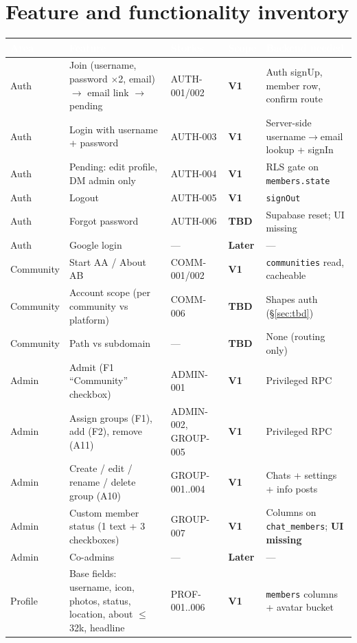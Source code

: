 \documentclass[11pt,a4paper]{article}
\newcommand{\hdr}[1]{\textcolor{white}{\textbf{#1}}}
\newcommand{\vone}{\textcolor{p0}{\textbf{V1}}}
\newcommand{\later}{\textcolor{p1}{\textbf{Later}}}
\newcommand{\tbd}{\textcolor{tbd}{\textbf{TBD}}}
\newcommand{\code}[1]{\texttt{\small #1}}
\begin{document}
\section{Feature and functionality inventory}
{\small
{}
\begin{longtable}{L{1.9cm} L{5.2cm} L{2.2cm} L{1.1cm} L{4.6cm}}
\hdr{Area} & \hdr{Feature} & \hdr{Stories} & \hdr{Scope} & \hdr{Backend needed}\\
\endhead
Auth & Join (username, password $\times$2, email) $\rightarrow$ email link $\rightarrow$ pending & AUTH-001/002 & \vone & Auth signUp, member row, confirm route\\
Auth & Login with username + password & AUTH-003 & \vone & Server-side username$\rightarrow$email lookup + signIn\\
Auth & Pending: edit profile, DM admin only & AUTH-004 & \vone & RLS gate on \code{members.state}\\
Auth & Logout & AUTH-005 & \vone & \code{signOut}\\
Auth & Forgot password & AUTH-006 & \tbd & Supabase reset; UI missing\\
Auth & Google login & --- & \later & ---\\
Community & Start AA / About AB & COMM-001/002 & \vone & \code{communities} read, cacheable\\
Community & Account scope (per community vs platform) & COMM-006 & \tbd & Shapes auth (\S\ref{sec:tbd})\\
Community & Path vs subdomain & --- & \tbd & None (routing only)\\
Admin & Admit (F1 ``Community'' checkbox) & ADMIN-001 & \vone & Privileged RPC\\
Admin & Assign groups (F1), add (F2), remove (A11) & ADMIN-002, GROUP-005 & \vone & Privileged RPC\\
Admin & Create / edit / rename / delete group (A10) & GROUP-001..004 & \vone & Chats + settings + info posts\\
Admin & Custom member status (1 text + 3 checkboxes) & GROUP-007 & \vone & Columns on \code{chat\_members}; \textbf{UI missing}\\
Admin & Co-admins & --- & \later & ---\\
Profile & Base fields: username, icon, photos, status, location, about $\le$ 32k, headline & PROF-001..006 & \vone & \code{members} columns + avatar bucket\\

\end{longtable}}
\end{document}
